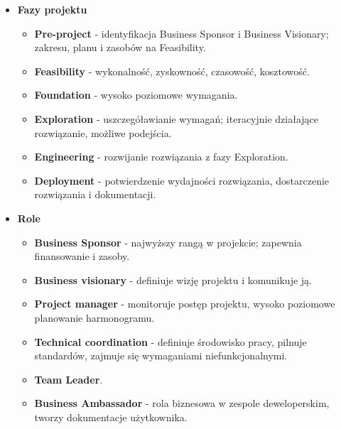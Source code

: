 \documentclass[a4paper]{article}
\begin{document}
    \begin{itemize}
        \item \textbf{Fazy projektu}
        \begin{itemize}
            \item \textbf{Pre-project} - identyfikacja Business Sponsor i Business Visionary; zakresu, planu i zasobów na Feasibility.

            \item \textbf{Feasibility} - wykonalność, zyskowność, czasowość, kosztowość.

            \item \textbf{Foundation} - wysoko poziomowe wymagania.

            \item \textbf{Exploration} - uszczegóławianie wymagań; iteracyjnie działające rozwiązanie, możliwe podejścia.

            \item \textbf{Engineering} - rozwijanie rozwiązania z fazy Exploration.

            \item \textbf{Deployment} - potwierdzenie wydajności rozwiązania, dostarczenie rozwiązania i dokumentacji.
        \end{itemize}

        \item \textbf{Role}
        \begin{itemize}
            \item \textbf{Business Sponsor} - najwyższy rangą w projekcie; zapewnia finansowanie i zasoby.

            \item \textbf{Business visionary} - definiuje wizję projektu i komunikuje ją.

            \item \textbf{Project manager} - monitoruje postęp projektu, wysoko poziomowe planowanie harmonogramu.

            \item \textbf{Technical coordination} - definiuje środowisko pracy, pilnuje standardów, zajmuje się wymaganiami niefunkcjonalnymi.

            \item \textbf{Team Leader}.

            \item \textbf{Business Ambassador} - rola biznesowa w zespole deweloperskim, tworzy dokumentacje użytkownika.


\end{itemize}
\end{itemize}
\end{document}
